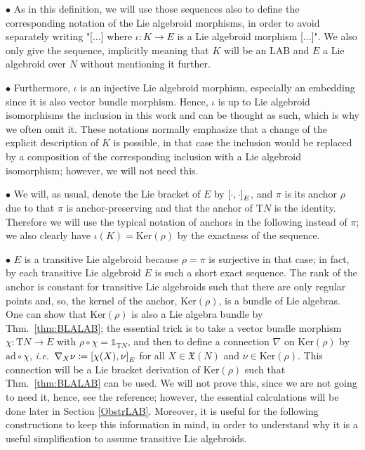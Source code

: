 \begin{remark}
\leavevmode\newline
\indent $\bullet$ As in this definition, we will use those sequences also to define the corresponding notation of the Lie algebroid morphisms, in order to avoid separately writing "[$\dotsc$] where $\iota: K \to E$ is a Lie algebroid morphism [$\dotsc$]". We also only give the sequence, implicitly meaning that $K$ will be an LAB and $E$ a Lie algebroid over $N$ without mentioning it further. 

$\bullet$ Furthermore, $\iota$ is an injective Lie algebroid morphism, especially an embedding since it is also vector bundle morphism. Hence, $\iota$ is up to Lie algebroid isomorphisms the inclusion in this work and can be thought as such, which is why we often omit it. These notations normally emphasize that a change of the explicit description of $K$ is possible, in that case the inclusion would be replaced by a composition of the corresponding inclusion with a Lie algebroid isomorphism; however, we will not need this.

$\bullet$ We will, as usual, denote the Lie bracket of $E$ by $\mleft[ \cdot, \cdot \mright]_E$, and $\pi$ is its anchor $\rho$ due to that $\pi$ is anchor-preserving and that the anchor of $\mathrm{T}N$ is the identity. Therefore we will use the typical notation of anchors in the following instead of $\pi$; we also clearly have $\iota(K) = \mathrm{Ker}(\rho)$ by the exactness of the sequence.

$\bullet$ $E$ is a transitive Lie algebroid because $\rho = \pi$ is surjective in that case; in fact, by \cite[Theorem 6.5.1; page 248]{mackenzieGeneralTheory} each transitive Lie algebroid $E$ is such a short exact sequence. The rank of the anchor is constant for transitive Lie algebroids such that there are only regular points and, so, the kernel of the anchor, $\mathrm{Ker}(\rho)$, is a bundle of Lie algebras. One can show that $\mathrm{Ker}(\rho)$ is also a Lie algebra bundle by Thm.~\ref{thm:BLALAB}; the essential trick is to take a vector bundle morphism $\chi: \mathrm{T}N \to E$ with $\rho \circ \chi = \mathds{1}_{\mathrm{T}N}$, and then to define a connection $\nabla$ on $\mathrm{Ker}(\rho)$ by $\mathrm{ad} \circ \chi$, \textit{i.e.}~$\nabla_X \nu \coloneqq \mleft[ \chi(X), \nu \mright]_E$ for all $X \in \mathfrak{X}(N)$ and $\nu \in \mathrm{Ker}(\rho)$. This connection will be a Lie bracket derivation of $\mathrm{Ker}(\rho)$ such that Thm.~\ref{thm:BLALAB} can be used. We will not prove this, since we are not going to need it, hence, see the reference; however, the essential calculations will be done later in Section \ref{ObstrLAB}. Moreover, it is useful for the following constructions to keep this information in mind, in order to understand why it is a useful simplification to assume transitive Lie algebroids.


\end{remark}
